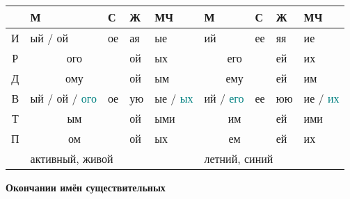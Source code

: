 \documentclass[a4paper, landscape, 11pt]{article}
\newcommand{\an}[1]{\textcolor{teal}{#1}} %
\begin{document}
\begin{tabularx}{\textwidth}{|c|X|X|X|X||X|X|X|X|}
	\hline
	  & М                   & С  & Ж  & МЧ                     & М             & С        & Ж  & МЧ           \\ \hline
	И & ый / ой             & ое & ая & ые                     & ий            & ее       & яя & ие           \\
	Р & \multicolumn{2}{c|}{ого} & ой & ых                     & \multicolumn{2}{c|}{его} & ей & их           \\
	Д & \multicolumn{2}{c|}{ому} & ой & ым                     & \multicolumn{2}{c|}{ему} & ей & им           \\
	В & ый / ой  / \an{ого} & ое & ую & ые / \an{ых}           & ий / \an{его} & ее       & юю & ие / \an{их} \\
	Т & \multicolumn{2}{c|}{ым}  & ой & ыми                    & \multicolumn{2}{c|}{им}  & ей & ими          \\
	П & \multicolumn{2}{c|}{ом}  & ой & ых                     & \multicolumn{2}{c|}{ем}  & ей & их           \\ \hline
	  & \multicolumn{4}{l||}{активный, живой} & \multicolumn{4}{l|}{летний, синий}           \\ \hline
\end{tabularx}

\vfill

\begin{center}
\Huge\bfseries Окончании имён существительных
\end{center}
\end{document}
